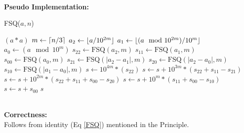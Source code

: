 \documentclass[11pt, fleqn]{article}
\DeclarePairedDelimiter\ceil{\lceil}{\rceil}
\DeclarePairedDelimiter\floor{\lfloor}{\rfloor}
\begin{document}
~\\
\textbf{Pseudo Implementation:}\\
\begin{algorithm}[H]
    \SetAlgoLined
    \DontPrintSemicolon
    \caption{FSQ($a, n$)}
     {
        \KwRet $(a * a)$\;
    }{
        $m \leftarrow \ceil{n/3}$\;
        $a_2 \leftarrow \floor{a/10^{2m}}$\;
        $a_1 \leftarrow \floor{(a \mod 10^{2m})/10^{m}}$\;
        $a_0 \leftarrow (a \mod 10^{m})$\;
        $s_{22} \leftarrow \text{FSQ}(a_2, m)$ \;
        $s_{11} \leftarrow \text{FSQ}(a_1, m)$ \;
        $s_{00} \leftarrow \text{FSQ}(a_0, m)$ \;
        $s_{21} \leftarrow \text{FSQ}(|a_2 - a_1|, m)$ \;
        $s_{20} \leftarrow \text{FSQ}(|a_2 - a_0|, m)$ \;
        $s_{10} \leftarrow \text{FSQ}(|a_1 - a_0|, m)$ \;
        $s \leftarrow 10^{4m} * (s_{22})$\;
        $s \leftarrow s + 10^{3m} * (s_{22} + s_{11} - s_{21})$\;
        $s \leftarrow s + 10^{2m} * (s_{22} + s_{11} + s_{00} - s_{20})$\;
        $s \leftarrow s + 10^{m} * (s_{11} + s_{00} - s_{10})$\;
        $s \leftarrow s + s_{00}$\;
        \KwRet $s$\;
    }
\end{algorithm}

~\\
\textbf{Correctness:}\\
Follows from identity (Eq \ref{FSQ}) mentioned in the Principle.
\end{document}
